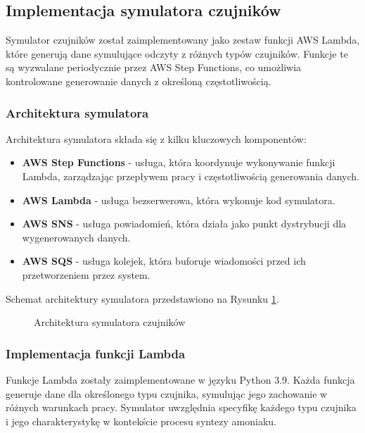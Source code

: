 \subsection{Implementacja symulatora czujników}
\label{subsec:implementacja_symulatora}

Symulator czujników został zaimplementowany jako zestaw funkcji AWS Lambda, które generują dane symulujące odczyty z różnych typów czujników. Funkcje te są wyzwalane periodycznie przez AWS Step Functions, co umożliwia kontrolowane generowanie danych z określoną częstotliwością.

\subsubsection{Architektura symulatora}
\label{subsubsec:architektura_symulatora}

Architektura symulatora składa się z kilku kluczowych komponentów:

\begin{itemize}
    \item \textbf{AWS Step Functions} - usługa, która koordynuje wykonywanie funkcji Lambda, zarządzając przepływem pracy i częstotliwością generowania danych.
    \item \textbf{AWS Lambda} - usługa bezserwerowa, która wykonuje kod symulatora.
    \item \textbf{AWS SNS} - usługa powiadomień, która działa jako punkt dystrybucji dla wygenerowanych danych.
    \item \textbf{AWS SQS} - usługa kolejek, która buforuje wiadomości przed ich przetworzeniem przez system.
\end{itemize}

Schemat architektury symulatora przedstawiono na Rysunku \ref{fig:architektura_symulatora}.

\begin{figure}[h]
    \centering
    \caption{Architektura symulatora czujników}
    \label{fig:architektura_symulatora}
\end{figure}

\subsubsection{Implementacja funkcji Lambda}
\label{subsubsec:implementacja_lambda}

Funkcje Lambda zostały zaimplementowane w języku Python 3.9. Każda funkcja generuje dane dla określonego typu czujnika, symulując jego zachowanie w różnych warunkach pracy. Symulator uwzględnia specyfikę każdego typu czujnika i jego charakterystykę w kontekście procesu syntezy amoniaku.

